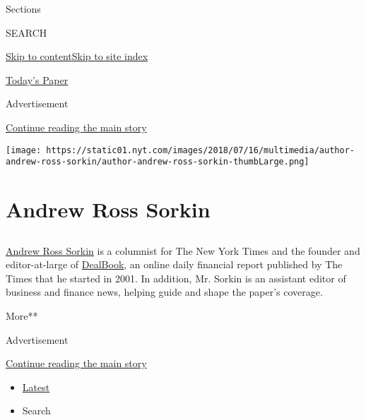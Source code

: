 Sections

SEARCH

\protect\hyperlink{site-content}{Skip to
content}\protect\hyperlink{site-index}{Skip to site index}

\href{https://myaccount.nytimes.com/auth/login?response_type=cookie\&client_id=vi}{}

\href{https://www.nytimes.com/section/todayspaper}{Today's Paper}

Advertisement

\protect\hyperlink{after-top}{Continue reading the main story}

\texttt{[image: https://static01.nyt.com/images/2018/07/16/multimedia/author-andrew-ross-sorkin/author-andrew-ross-sorkin-thumbLarge.png]}

\hypertarget{andrew-ross-sorkin}{%
\section{Andrew Ross Sorkin}\label{andrew-ross-sorkin}}

\subsection{}

\href{http://www.andrewrosssorkin.com}{Andrew Ross Sorkin} is a
columnist for The New York Times and the founder and editor-at-large of
\href{http://dealbook.nytimes.com}{DealBook}, an online daily financial
report published by The Times that he started in 2001. In addition, Mr.
Sorkin is an assistant editor of business and finance news, helping
guide and shape the paper's coverage.

More**

Advertisement

\protect\hyperlink{after-mid1}{Continue reading the main story}

\begin{itemize}
\tightlist
\item
  \protect\hyperlink{stream-panel}{Latest}
\item
  Search
\end{itemize}

